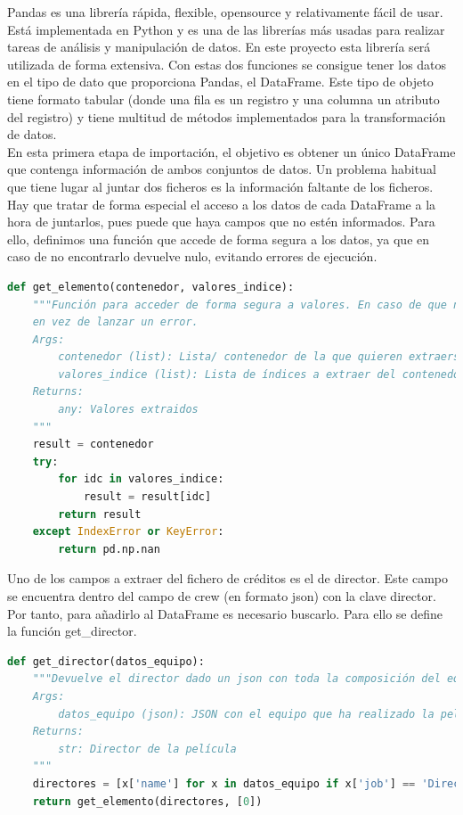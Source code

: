 Pandas es una librería rápida, flexible, opensource y relativamente fácil de usar. Está implementada en Python y es una de las librerías más usadas para realizar tareas de análisis y manipulación de datos. En este proyecto esta librería será utilizada de forma extensiva. Con estas dos funciones se consigue tener los datos en el tipo de dato que proporciona Pandas, el DataFrame. Este tipo de objeto tiene formato tabular (donde una fila es un registro y una columna un atributo del registro) y tiene multitud de métodos implementados para la transformación de datos.\\

En esta primera etapa de importación, el objetivo es obtener un único DataFrame que contenga información de ambos conjuntos de datos. Un problema habitual que tiene lugar al juntar dos ficheros es la información faltante de los ficheros. Hay que tratar de forma especial el acceso a los datos de cada DataFrame a la hora de juntarlos, pues puede que haya campos que no estén informados. Para ello, definimos una función que accede de forma segura a los datos, ya que en caso de no encontrarlo devuelve nulo, evitando errores de ejecución.

\begin{lstlisting}[language=Python, caption={Acceso a los datos de forma segura. Se utiliza como proxy para no acceder directamente al valor. De esta forma, si se da un error, en vez de tener un error de ejecución se devuelve nulo.}]
def get_elemento(contenedor, valores_indice):
    """Función para acceder de forma segura a valores. En caso de que no se encuentre uno de ellos, se devuelve NaN
    en vez de lanzar un error.
    Args:
        contenedor (list): Lista/ contenedor de la que quieren extraerse los valores
        valores_indice (list): Lista de índices a extraer del contenedor
    Returns:
        any: Valores extraidos
    """
    result = contenedor
    try:
        for idc in valores_indice:
            result = result[idc]
        return result
    except IndexError or KeyError:
        return pd.np.nan
\end{lstlisting}

Uno de los campos a extraer del fichero de créditos es el de director. Este campo se encuentra dentro del campo de crew (en formato json) con la clave director. Por tanto, para añadirlo al DataFrame es necesario buscarlo. Para ello se define la función get\_director.
\begin{lstlisting}[language=Python, caption= {Obtención de una lista de directores extraidos del campo crew. Se itera por todos los miembros del equipo y se retienen unicamente aquellos que tienen el cargo de director.}]
def get_director(datos_equipo):
    """Devuelve el director dado un json con toda la composición del equipo de la película.
    Args:
        datos_equipo (json): JSON con el equipo que ha realizado la película
    Returns:
        str: Director de la película
    """
    directores = [x['name'] for x in datos_equipo if x['job'] == 'Director']
    return get_elemento(directores, [0])
\end{lstlisting}

